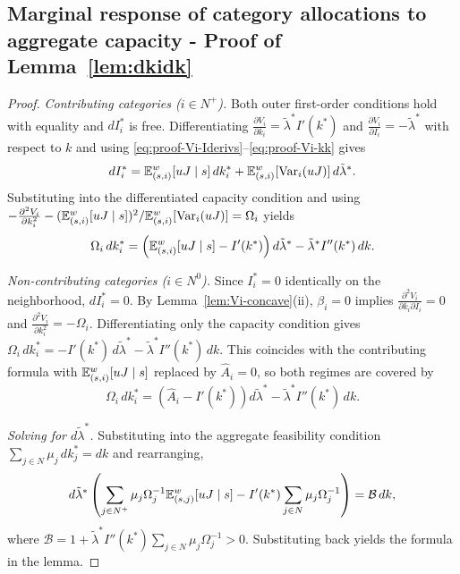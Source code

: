 \documentclass{class}
\begin{document}

\subsection{Marginal response of category allocations to aggregate capacity - Proof of Lemma~\ref{lem:dkidk}}\label{proof:dkidk}


\begin{proof}
\textit{Contributing categories ($i\in N^+$).} Both outer first-order conditions hold with equality and $dI_i^\ast$ is free. Differentiating $\frac{\partial V_i}{\partial k_i}=\tilde\lambda^\ast I'(k^\ast)$ and $\frac{\partial V_i}{\partial I_i}=-\tilde\lambda^\ast$ with respect to $k$ and using \ref{eq:proof-Vi-Iderivs}--\ref{eq:proof-Vi-kk} gives
\[
dI_i^\ast = \mathbb{E}_{(s,i)}^w[uJ\mid s]\,dk_i^\ast + \mathbb{E}_{(s,i)}^w[\mathrm{Var}_i(uJ)]\,d\tilde\lambda^\ast.
\]
Substituting into the differentiated capacity condition and using $-\frac{\partial^2 V_i}{\partial k_i^2}-(\mathbb{E}_{(s,i)}^w[uJ\mid s])^2/\mathbb{E}_{(s,i)}^w[\mathrm{Var}_i(uJ)]=\Omega_i$ yields
\[
\Omega_i\,dk_i^\ast = \left(\mathbb{E}_{(s,i)}^w[uJ\mid s]-I'(k^\ast)\right)d\tilde\lambda^\ast - \tilde\lambda^\ast I''(k^\ast)\,dk.
\]

\textit{Non-contributing categories ($i\in N^0$).} Since $I_i^\ast=0$ identically on the neighborhood, $dI_i^\ast=0$. By Lemma~\ref{lem:Vi-concave}(ii), $\beta_i=0$ implies $\frac{\partial^2 V_i}{\partial k_i \partial I_i}=0$ and $\frac{\partial^2 V_i}{\partial k_i^2}=-\Omega_i$. Differentiating only the capacity condition gives
$\Omega_i\,dk_i^\ast = -I'(k^\ast)\,d\tilde\lambda^\ast - \tilde\lambda^\ast I''(k^\ast)\,dk.$
This coincides with the contributing formula with $\mathbb{E}_{(s,i)}^w[uJ\mid s]$ replaced by $\hat A_i=0$, so both regimes are covered by
\[
\Omega_i\,dk_i^\ast = \left(\hat A_i - I'(k^\ast)\right)d\tilde\lambda^\ast - \tilde\lambda^\ast I''(k^\ast)\,dk.
\]

\textit{Solving for $d\tilde\lambda^\ast$.} Substituting into the aggregate feasibility condition $\sum_{j\in N}\mu_j\,dk_j^\ast=dk$ and rearranging,
\[
d\tilde\lambda^\ast\left(\sum_{j\in N^+}\mu_j\Omega_j^{-1}\mathbb{E}_{(s,j)}^w[uJ\mid s] - I'(k^\ast)\sum_{j\in N}\mu_j\Omega_j^{-1}\right) = \mathcal B\,dk,
\]
where $\mathcal B=1+\tilde\lambda^\ast I''(k^\ast)\sum_{j\in N}\mu_j\Omega_j^{-1}>0$. Substituting back yields the formula in the lemma.
\end{proof}
\end{document}
